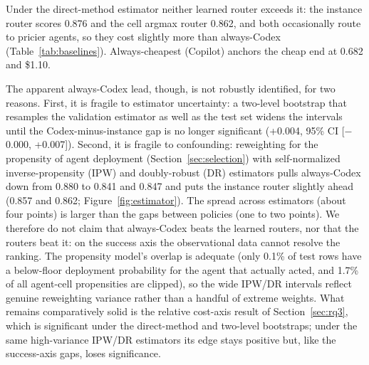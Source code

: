 \documentclass[sigconf,nonacm]{acmart}
\begin{document}
Under the direct-method estimator neither learned router exceeds it: the instance router scores 0.876 and the cell argmax router 0.862, and both occasionally route to pricier agents, so they cost slightly more than always-Codex (Table~\ref{tab:baselines}). Always-cheapest (Copilot) anchors the cheap end at 0.682 and \$1.10.

The apparent always-Codex lead, though, is not robustly identified, for two reasons. First, it is fragile to estimator uncertainty: a two-level bootstrap that resamples the validation estimator as well as the test set widens the intervals until the Codex-minus-instance gap is no longer significant (+0.004, 95\% CI [$-$0.000, +0.007]). Second, it is fragile to confounding: reweighting for the propensity of agent deployment (Section~\ref{sec:selection}) with self-normalized inverse-propensity (IPW) and doubly-robust (DR) estimators pulls always-Codex down from 0.880 to 0.841 and 0.847 and puts the instance router slightly ahead (0.857 and 0.862; Figure~\ref{fig:estimator}). The spread across estimators (about four points) is larger than the gaps between policies (one to two points). We therefore do not claim that always-Codex beats the learned routers, nor that the routers beat it: on the success axis the observational data cannot resolve the ranking. The propensity model's overlap is adequate (only 0.1\% of test rows have a below-floor deployment probability for the agent that actually acted, and 1.7\% of all agent-cell propensities are clipped), so the wide IPW/DR intervals reflect genuine reweighting variance rather than a handful of extreme weights. What remains comparatively solid is the relative cost-axis result of Section~\ref{sec:rq3}, which is significant under the direct-method and two-level bootstraps; under the same high-variance IPW/DR estimators its edge stays positive but, like the success-axis gaps, loses significance.
\end{document}
